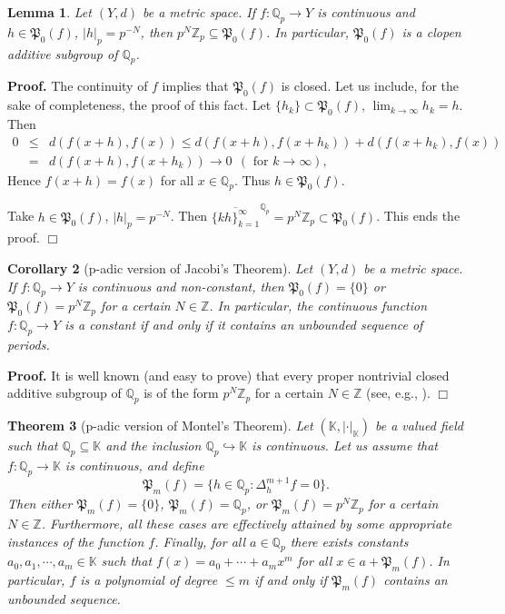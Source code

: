 \documentclass[12pt,a4paper]{amsart}
\newtheorem{theorem}{Theorem}[section]
\newtheorem{lemma}[theorem]{Lemma}
\newtheorem{corollary}[theorem]{Corollary}
\theoremstyle{definition}
\begin{document}
\begin{lemma}
Let $(Y,d)$ be a metric space. If $f:\mathbb{Q}_p\to Y$ is continuous and $h\in \mathfrak{P}_0(f)$, $|h|_p=p^{-N}$,  then $p^N\mathbb{Z}_p\subseteq \mathfrak{P}_0(f)$. In particular, $\mathfrak{P}_0(f)$ is a clopen additive subgroup of $\mathbb{Q}_p$.
\end{lemma}

\noindent \textbf{Proof. } The continuity of $f$ implies that $\mathfrak{P}_0(f)$ is closed. Let us include, for the sake of completeness, the proof of this fact.  Let $\{h_k\}\subset \mathfrak{P}_0(f)$, $\lim_{k\to\infty}h_k=h$. Then
\begin{eqnarray*}
0 &\leq& d(f(x+h),f(x))\leq d(f(x+h),f(x+h_k))+d(f(x+h_k),f(x))\\
&=& d(f(x+h),f(x+h_k))\to 0  \ \ (\text{ for } k\to\infty),
\end{eqnarray*}
Hence $f(x+h)=f(x)$ for all $x\in\mathbb{Q}_p$. Thus $h\in \mathfrak{P}_0(f)$.

Take $h\in \mathfrak{P}_0(f)$, $|h|_p=p^{-N}$. Then $\overline{\{kh\}_{k=1}^\infty}^{\mathbb{Q}_p}=p^N\mathbb{Z}_p\subset \mathfrak{P}_0(f)$. This ends the proof. {\hfill $\Box$}

\begin{corollary}[p-adic version of Jacobi's Theorem] Let $(Y,d)$ be a metric space. If $f:\mathbb{Q}_p\to Y$ is continuous and non-constant, then $\mathfrak{P}_0(f)=\{0\}$ or $\mathfrak{P}_0(f)=p^N\mathbb{Z}_p$ for a certain $N\in\mathbb{Z}$. In particular, the continuous function $f:\mathbb{Q}_p\to Y$ is a constant if and only if it contains an unbounded sequence of periods.
\end{corollary}

\noindent \textbf{Proof. } It is well known (and easy to prove) that every proper nontrivial closed additive subgroup of $\mathbb{Q}_p$ is of the form  $p^N\mathbb{Z}_p$ for a certain $N\in\mathbb{Z}$ (see, e.g., \cite[p. 283, Proposition 52.3]{classicalfields}).   {\hfill $\Box$}

 \begin{theorem}[p-adic version of Montel's Theorem]  \label{mont} Let $(\mathbb{K},|\cdot|_{\mathbb{K}})$ be a valued field such that $\mathbb{Q}_p\subseteq \mathbb{K}$ and the inclusion $\mathbb{Q}_p \hookrightarrow\mathbb{K}$ is continuous. Let us assume that $f:\mathbb{Q}_p\to \mathbb{K}$ is continuous, and define
 \[
 \mathfrak{P}_m(f)=\{h\in\mathbb{Q}_p:\Delta_h^{m+1}f=0\}.
 \]
Then either $\mathfrak{P}_m(f) =\{0\}$,  $\mathfrak{P}_m(f) = \mathbb{Q}_p$, or $\mathfrak{P}_m(f)=p^N\mathbb{Z}_p$ for a certain  $N\in\mathbb{Z}$. Furthermore, all these cases are effectively attained by some appropriate instances of the function $f$. Finally, for all $a\in\mathbb{Q}_p$ there exists constants $a_0,a_1,\cdots,a_m\in \mathbb{K}$ such that $f(x)=a_0+\cdots+a_mx^m$ for all $x\in a+\mathfrak{P}_m(f)$.
In particular, $f$ is a polynomial of degree $\leq m$ if and only if $\mathfrak{P}_m(f)$ contains an unbounded sequence. \end{theorem}
\end{document}
